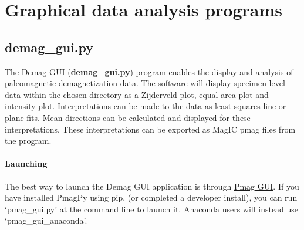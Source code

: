 \documentclass[11pt]{book}
\begin{document}
{{%
%
%
%

\chapter{Graphical data analysis programs}
\section{demag\_gui.py}

The  Demag GUI ({\bf demag\_gui.py}) program enables the display and analysis of paleomagnetic demagnetization data. The software will display specimen level data within the chosen directory as a Zijderveld plot, equal area plot and intensity plot. Interpretations can be made to the data as least-squares line or plane fits. Mean directions can be calculated and displayed for these interpretations. These interpretations can be exported as MagIC pmag files from the program.

\subsubsection{Launching}\label{launching}

The best way to launch the Demag GUI application is through  \href{#pmag_gui.py}{Pmag GUI}. If you have installed PmagPy using pip, (or completed a developer install), you can run `pmag\_gui.py' at the command line to launch it.  Anaconda users will instead use `pmag\_gui\_anaconda'.

}}
\end{document}
